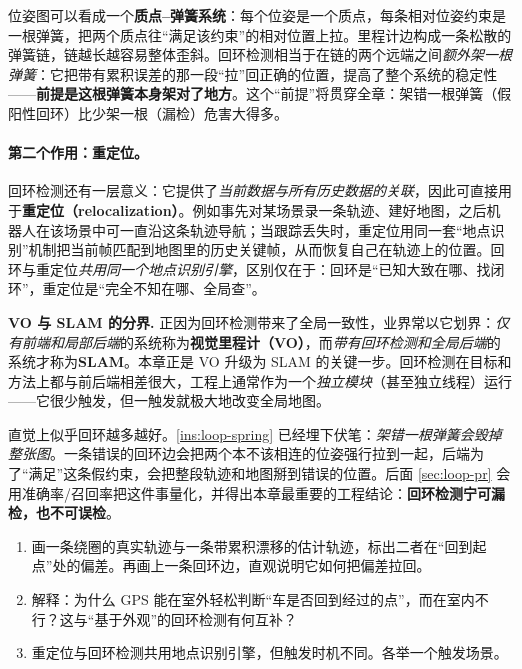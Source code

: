 \begin{insight}[回环边 = 给位姿图加一根弹簧]\label{ins:loop-spring}
位姿图可以看成一个\textbf{质点--弹簧系统}：每个位姿是一个质点，每条相对位姿约束是一根弹簧，把两个质点往“满足该约束”的相对位置上拉\cite{gaoxiang2019slam14}。里程计边构成一条松散的弹簧链，链越长越容易整体歪斜。回环检测相当于在链的两个远端之间\emph{额外架一根弹簧}：它把带有累积误差的那一段“拉”回正确的位置，提高了整个系统的稳定性——\textbf{前提是这根弹簧本身架对了地方}。这个“前提”将贯穿全章：架错一根弹簧（假阳性回环）比少架一根（漏检）危害大得多。
\end{insight}

\paragraph{第二个作用：重定位。}
回环检测还有一层意义\cite{gaoxiang2019slam14}：它提供了\emph{当前数据与所有历史数据的关联}，因此可直接用于\textbf{重定位（relocalization）}。例如事先对某场景录一条轨迹、建好地图，之后机器人在该场景中可一直沿这条轨迹导航；当跟踪丢失时，重定位用同一套“地点识别”机制把当前帧匹配到地图里的历史关键帧，从而恢复自己在轨迹上的位置。回环与重定位\emph{共用同一个地点识别引擎}，区别仅在于：回环是“已知大致在哪、找闭环”，重定位是“完全不知在哪、全局查”。

\begin{note}
\textbf{VO 与 SLAM 的分界.}\;
正因为回环检测带来了全局一致性，业界常以它划界\cite{gaoxiang2019slam14}：\emph{仅有前端和局部后端}的系统称为\textbf{视觉里程计（VO）}，而\emph{带有回环检测和全局后端}的系统才称为\textbf{SLAM}。本章正是 VO 升级为 SLAM 的关键一步。回环检测在目标和方法上都与前后端相差很大，工程上通常作为一个\emph{独立模块}（甚至独立线程）运行——它很少触发，但一触发就极大地改变全局地图。
\end{note}

\begin{pitfall}
直觉上似乎回环越多越好。\cref{ins:loop-spring} 已经埋下伏笔：\emph{架错一根弹簧会毁掉整张图}。一条错误的回环边会把两个本不该相连的位姿强行拉到一起，后端为了“满足”这条假约束，会把整段轨迹和地图掰到错误的位置。后面 \cref{sec:loop-pr} 会用准确率/召回率把这件事量化，并得出本章最重要的工程结论：\textbf{回环检测宁可漏检，也不可误检}。
\end{pitfall}

\begin{practice}
\begin{enumerate}
  \item 画一条绕圈的真实轨迹与一条带累积漂移的估计轨迹，标出二者在“回到起点”处的偏差。再画上一条回环边，直观说明它如何把偏差拉回。
  \item 解释：为什么 GPS 能在室外轻松判断“车是否回到经过的点”，而在室内不行？这与“基于外观”的回环检测有何互补？
  \item 重定位与回环检测共用地点识别引擎，但触发时机不同。各举一个触发场景。
\end{enumerate}
\end{practice}

